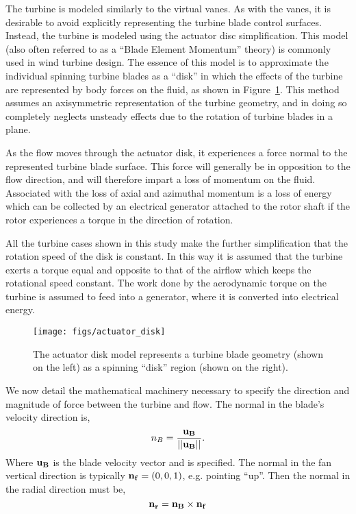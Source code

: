 The turbine is modeled similarly to the virtual vanes. As with the
vanes, it is desirable to avoid explicitly representing the turbine
blade control surfaces. Instead, the turbine is modeled using the
actuator disc simplification. 
This model (also often referred to as a ``Blade Element Momentum''
theory) is commonly used in wind
turbine design\cite{shevell1983fundamentals,betz,leclerc}. The essence
of this model is to approximate the individual spinning turbine blades
as a ``disk'' in which the effects of the turbine are represented by
body forces on the fluid, as shown in Figure~\ref{fig:actuator_disk}.
This method assumes an axisymmetric representation of the turbine
geometry, and in doing so completely neglects unsteady effects due to
the rotation of turbine blades in a plane. 

As the flow moves through the actuator disk, it experiences a force
normal to the represented turbine blade surface. This force will
generally be in opposition to the flow direction, and will therefore
impart a loss of momentum on the fluid. 
Associated with the loss of axial and azimuthal momentum is a loss of
energy which can be collected by an electrical generator attached
to the rotor shaft if the rotor experiences a torque
in the direction of rotation. 

All the turbine cases shown in this study make the further
simplification that the rotation speed of the disk is constant. 
In this way it is assumed that the turbine exerts a torque equal and
opposite to that of the airflow which keeps the rotational speed
constant. The work done by the aerodynamic torque on the
turbine is assumed to feed into a generator, where it is converted into
electrical energy. 


   \begin{figure}[!htb]
    \centering
    \texttt{[image: figs/actuator\_disk]}
     \caption{The actuator disk model represents a turbine blade
    geometry (shown on the left) as a spinning ``disk'' region (shown
    on the right).}
     \label{fig:actuator_disk}
   \end{figure}

We now detail the mathematical machinery necessary to specify the
direction and magnitude of force between the turbine and flow. The
normal in the blade's velocity direction is, 
\begin{equation*}
n_B = \frac{{\bf u_B}}{||{\bf u_B}||}. 
\end{equation*}
Where ${\bf u_B}$ is the blade velocity vector and is specified. The
normal in the fan vertical direction is typically ${\bf n_f} =
\left(0,0,1\right)$, e.g. pointing ``up''. Then the normal in the radial
direction must be,  
\begin{equation*}
{\bf n_r} = {\bf n_B} \times {\bf n_f}
\end{equation*}

